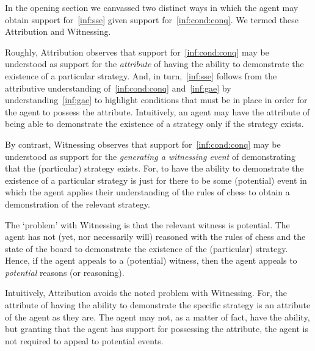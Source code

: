 \documentclass[10pt]{article}
\newcommand{\WR}[0]{\textsf{Witnessing}}
\newcommand{\AR}[0]{\textsf{Attribution}}
\begin{document}
\begin{note}
  In the opening section we canvassed two distinct ways in which the agent may obtain support for~\ref{inf:sse} given support for~\ref{inf:cond:conq}.
  We termed these \AR{} and \WR{}.

  Roughly, \AR{} observes that support for~\ref{inf:cond:conq} may be understood as support for the \emph{attribute} of having the ability to demonstrate the existence of a particular strategy.
  And, in turn,~\ref{inf:sse} follows from the attributive understanding of~\ref{inf:cond:conq} and~\ref{inf:gae} by understanding~\ref{inf:gae} to highlight conditions that must be in place in order for the agent to possess the attribute.
  Intuitively, an agent may have the attribute of being able to demonstrate the existence of a strategy only if the strategy exists.

  By contrast, \WR{} observes that support for~\ref{inf:cond:conq} may be understood as support for the \emph{generating a witnessing event} of demonstrating that the (particular) strategy exists.
  For, to have the ability to demonstrate the existence of a particular strategy is just for there to be some (potential) event in which the agent applies their understanding of the rules of chess to obtain a demonstration of the relevant strategy.

  The `problem' with \WR{} is that the relevant witness is potential.
  The agent has not (yet, nor necessarily will) reasoned with the rules of chess and the state of the board to demonstrate the existence of the (particular) strategy.
  Hence, if the agent appeals to a (potential) witness, then the agent appeals to \emph{potential} reasons (or reasoning).

  Intuitively, \AR{} avoids the noted problem with \WR{}.
  For, the attribute of having the ability to demonstrate the specific strategy is an attribute of the agent as they are.
  The agent may not, as a matter of fact, have the ability, but granting that the agent has support for possessing the attribute, the agent is not required to appeal to potential events.
\end{note}
\end{document}
